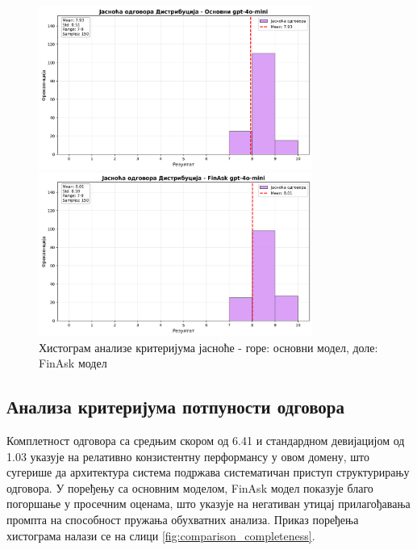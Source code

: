 \begin{figure}[h]
    \centering
    \includegraphics[width=0.8\textwidth]{images/osnovni/criteria_analysis_clarity_histogram.png}
    
    \vspace{0.5cm}
    
    \includegraphics[width=0.8\textwidth]{images/FinAsk/criteria_analysis_clarity_histogram.png}
    \caption{Хистограм анализе критеријума јасноће - горе: основни модел, доле: FinAsk модел}
    \label{fig:comparison_clarity}
\end{figure}

\subsection{Анализа критеријума потпуности одговора}

Комплетност одговора са средњим скором од 6.41 и стандардном девијацијом од 1.03 указује на релативно конзистентну перформансу у овом домену, што сугерише да архитектура система подржава систематичан приступ структурирању одговора. У поређењу са основним моделом, FinAsk модел показује благо погоршање у просечним оценама, што указује на негативан утицај прилагођавања промпта на способност пружања обухватних анализа. Приказ поређења хистограма налази се на слици \ref{fig:comparison_completeness}.

